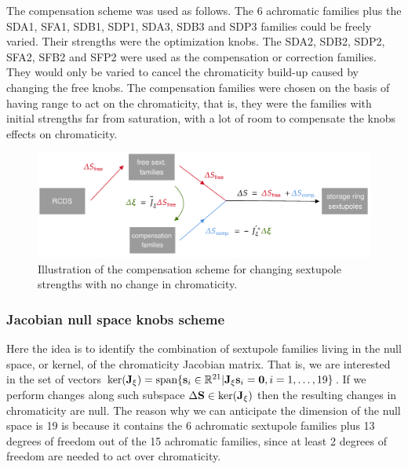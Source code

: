 The compensation scheme was used as follows. The 6 achromatic families plus the SDA1, SFA1, SDB1, SDP1, SDA3, SDB3 and SDP3 families could be freely varied. Their strengths were the optimization knobs. The SDA2, SDB2, SDP2, SFA2, SFB2 and SFP2 were used as the compensation or correction families. They would only be varied to cancel the chromaticity build-up caused by changing the free knobs. The compensation families were chosen on the basis of having range to act on the chromaticity, that is, they were the families with initial strengths far from saturation, with a lot of room to compensate the knobs effects on chromaticity.
\begin{figure}
    \centering
    \includegraphics[width=\textwidth]{Images/compensation_scheme.pdf}
    \caption[Illustration of the compensation scheme for changing sextupole strengths with no change in chromaticity.]{Illustration of the compensation scheme for changing sextupole strengths with no change in chromaticity.}
    \label{fig:compensation}
\end{figure}
\subsubsection{Jacobian null space knobs scheme}
\label{subsubsec:nullspace}
Here the idea is to identify the combination of sextupole families living in the null space, or kernel, of the chromaticity Jacobian matrix. That is, we are interested in the set of vectors $\text{ker}(\vb{J}_\xi)=\text{span}\{\vb{s}_i\in\mathbb{R}^{21}| \vb{J}_{\xi} \vb{s}_i = \vb{0}, i=1,\dots,19 \}$. If we perform changes along such subspace $\Delta \vb{S}\in\text{ker}(\vb{J}_\xi)$ then the resulting changes in chromaticity are null. The reason why we can anticipate the dimension of the null space is 19 is because it contains the 6 achromatic sextupole families plus 13 degrees of freedom out of the 15 achromatic families, since at least 2 degrees of freedom are needed to act over chromaticity.

